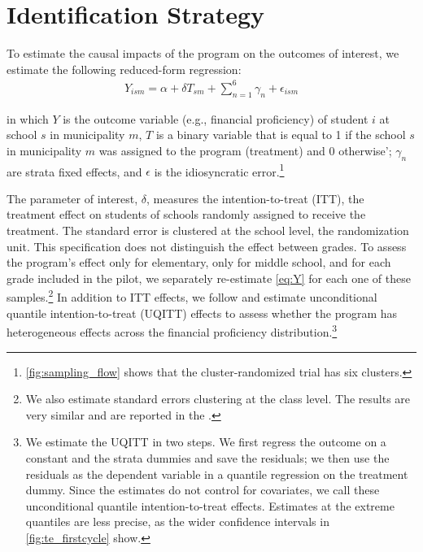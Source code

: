 \section{Identification Strategy} \label{sec:identification}

To estimate the causal impacts of the program on the outcomes of interest, we estimate the following reduced-form regression:
\begin{align} 
     Y_{ism}= \alpha + \delta T_{sm} + \sum_{n=1}^{6} \gamma_n  + \epsilon_{ism} 
     \label{eq:Y}
\end {align}

\noindent

in which $Y$ is the outcome variable (e.g., financial proficiency) of student $i$ at school $s$ in municipality $m$, $T$ is a binary variable that is equal to 1 if the school $s$ in municipality $m$ was assigned to the program (treatment) and 0 otherwise'; $\gamma_n$ are strata fixed effects, and $\epsilon$ is the idiosyncratic error.\footnote{\autoref{fig:sampling_flow} shows that the cluster-randomized trial has six clusters.}

The parameter of interest, $\delta$, measures the intention-to-treat (ITT), the treatment effect on students of schools randomly assigned to receive the treatment. The standard error is clustered at the school level, the randomization unit. This specification does not distinguish the effect between grades. To assess the program's effect only for elementary, only for middle school, and for each grade included in the pilot, we separately re-estimate \autoref{eq:Y} for each one of these samples.\footnote {We also estimate standard errors clustering at the class level. The results are very similar and are reported in the \onlineappendix.} In addition to ITT effects, we follow \cite{firpo2009unconditional} and estimate unconditional quantile intention-to-treat (UQITT) effects to assess whether the program has heterogeneous effects across the financial proficiency distribution.\footnote{We estimate the UQITT in two steps. We first regress the outcome on a constant and the strata dummies and save the residuals; we then use the residuals as the dependent variable in a quantile regression on the treatment dummy. Since the estimates do not control for covariates, we call these unconditional quantile intention-to-treat effects. Estimates at the extreme quantiles are less precise, as the wider confidence intervals in \autoref{fig:te_firstcycle} show.}

